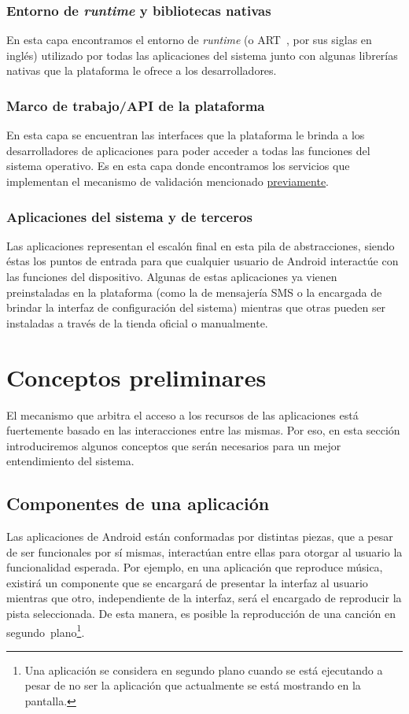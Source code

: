 \subsubsection*{Entorno de \textit{runtime} y bibliotecas nativas} En esta capa encontramos el
entorno de \textit{runtime} (o ART~\cite{art}, por sus siglas en inglés) utilizado por todas las
aplicaciones del sistema junto con algunas librerías nativas que la plataforma le ofrece a los
desarrolladores.

\subsubsection*{Marco de trabajo/API de la plataforma}
En esta capa se encuentran las interfaces que la plataforma le brinda a los desarrolladores de
aplicaciones para poder acceder a todas las funciones del sistema operativo. Es en esta capa donde
encontramos los servicios que implementan el mecanismo de validación mencionado
\hyperref[section:architecture:kernel]{previamente}.

\subsubsection*{Aplicaciones del sistema y de terceros}
Las aplicaciones representan el escalón final en esta pila de abstracciones, siendo éstas los puntos
de entrada para que cualquier usuario de Android interactúe con las funciones del dispositivo.
Algunas de estas aplicaciones ya vienen preinstaladas en la plataforma (como la de mensajería SMS o
la encargada de brindar la interfaz de configuración del sistema) mientras que otras pueden ser
instaladas a través de la tienda oficial o manualmente.


\section{Conceptos preliminares}
\label{section:preliminary}
El mecanismo que arbitra el acceso a los recursos de las aplicaciones está fuertemente basado en las
interacciones entre las mismas. Por eso, en esta sección introduciremos algunos conceptos que serán
necesarios para un mejor entendimiento del sistema.

\subsection{Componentes de una aplicación}
\label{section:preliminary:components}
Las aplicaciones de Android están conformadas por distintas piezas, que a pesar de ser funcionales
por sí mismas, interactúan entre ellas para otorgar al usuario la funcionalidad esperada. Por
ejemplo, en una aplicación que reproduce música, existirá un componente que se encargará de
presentar la interfaz al usuario mientras que otro, independiente de la interfaz, será el encargado
de reproducir la pista seleccionada. De esta manera, es posible la reproducción de una canción en
segundo~plano\footnote{Una aplicación se considera en segundo plano cuando se está ejecutando a
    pesar de no ser la aplicación que actualmente se está mostrando en la pantalla.}.


